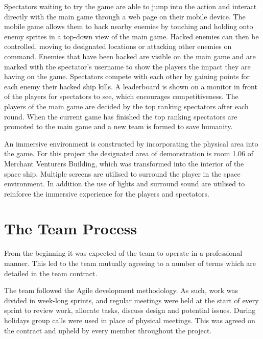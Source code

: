 \documentclass[a4paper,11pt]{article}
\begin{document}
Spectators waiting to try the game are able to jump into the action and interact directly with the main game through a web page on their mobile device. The mobile game allows them to hack nearby enemies by touching and holding onto enemy sprites in a top-down view of the main game. Hacked enemies can then be controlled, moving to designated locations or attacking other enemies on command. Enemies that have been hacked are visible on the main game and are marked with the spectator’s username to show the players the impact they are having on the game. Spectators compete with each other by gaining points for each enemy their hacked ship kills. A leaderboard is shown on a monitor in front of the players for spectators to see, which encourages competitiveness. The players of the main game are decided by the top ranking spectators after each round. When the current game has finished the top ranking spectators are promoted to the main game and a new team is formed to save humanity.

An immersive environment is constructed by incorporating the physical area into the game. For this project the designated area of demonstration is room 1.06 of Merchant Venturers Building, which was transformed into the interior of the space ship. Multiple screens are utilised to surround the player in the space environment. In addition the use of lights and surround sound are utilised to reinforce the immersive experience for the players and spectators. 


\clearpage

\section{The Team Process}

From the beginning it was expected of the team to operate in a professional manner. This led to the team mutually agreeing to a number of terms which are detailed in the team contract.

The team followed the Agile development methodology. As such, work was divided in week-long sprints, and regular meetings were held at the start of every sprint to review work, allocate tasks, discuss design and potential issues. During holidays group calls were used in place of physical meetings. This was agreed on the contract and upheld by every member throughout the project.
\end{document}
